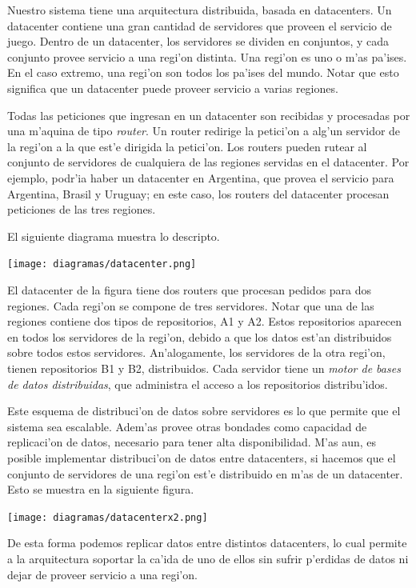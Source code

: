 Nuestro sistema tiene una arquitectura distribuida, basada en datacenters. Un datacenter contiene una gran cantidad de servidores que proveen el servicio de juego. Dentro de un datacenter, los servidores se dividen en conjuntos, y cada conjunto provee servicio a una regi'on distinta. Una regi'on es uno o m'as pa'ises. En el caso extremo, una regi'on son todos los pa'ises del mundo. Notar que esto significa que un datacenter puede proveer servicio a varias regiones.

Todas las peticiones que ingresan en un datacenter son recibidas y procesadas por una m'aquina de tipo \textit{router}. Un router redirige la petici'on a alg'un servidor de la regi'on a la que est'e dirigida la petici'on. Los routers pueden rutear al conjunto de servidores de cualquiera de las regiones servidas en el datacenter. Por ejemplo, podr'ia haber un datacenter en Argentina, que provea el servicio para Argentina, Brasil y Uruguay; en este caso, los routers del datacenter procesan peticiones de las tres regiones.

El siguiente diagrama muestra lo descripto. 

\texttt{[image: diagramas/datacenter.png]}

\noindent
El datacenter de la figura tiene dos routers que procesan pedidos para dos regiones. Cada regi'on se compone de tres servidores. Notar que una de las regiones contiene dos tipos de repositorios, A1 y A2. Estos repositorios aparecen en todos los servidores de la regi'on, debido a que los datos est'an distribuidos sobre todos estos servidores. An'alogamente, los servidores de la otra regi'on, tienen repositorios B1 y B2, distribuidos. Cada servidor tiene un \textit{motor de bases de datos distribuidas}, que administra el acceso a los repositorios distribu'idos.

Este esquema de distribuci'on de datos sobre servidores es lo que permite que el sistema sea escalable. Adem'as provee otras bondades como capacidad de replicaci'on de datos, necesario para tener alta disponibilidad. M'as aun, es posible implementar distribuci'on de datos entre datacenters, si hacemos que el conjunto de servidores de una regi'on est'e distribuido en m'as de un datacenter. Esto se muestra en la siguiente figura.

\texttt{[image: diagramas/datacenterx2.png]}

\noindent
De esta forma podemos replicar datos entre distintos datacenters, lo cual permite a la arquitectura soportar la ca'ida de uno de ellos sin sufrir p'erdidas de datos ni dejar de proveer servicio a una regi'on.


